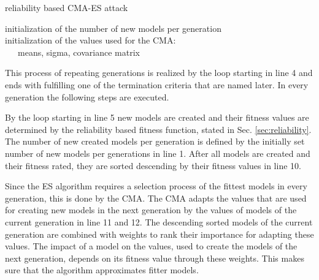 \SetAlCapHSkip{0.2em}
\begin{algorithm}[H] %
\Indm
\SetAlgoLined
\caption{reliability based \acl{CMA-ES} attack}
\label{alg:cma-es}
\Indp

initialization of the number of new models per generation\\
initialization of the values used for the \ac{CMA}:\\
\ \ \ means, sigma, covariance matrix\\
\end{algorithm}

This process of repeating generations is realized by the loop starting in line 4 and ends with fulfilling one of the termination criteria that are named later.
In every generation the following steps are executed.

By the loop starting in line 5 new models are created and their fitness values are determined by the reliability based fitness function, stated in Sec. \ref{sec:reliability}. %
The number of new created models per generation is defined by the initially set number of new models per generations in line 1.
After all models are created and their fitness rated, they are sorted descending by their fitness values in line 10.

Since the \ac{ES} algorithm requires a selection process of the fittest models in every generation, this is done by the \ac{CMA}.
The \ac{CMA} adapts the values that are used for creating new models in the next generation by the values of models of the current generation in line 11 and 12. %
The descending sorted models of the current generation are combined with weights to rank their importance for adapting these values.
The impact of a model on the values, used to create the models of the next generation, depends on its fitness value through these weights.
This makes sure that the algorithm approximates fitter models.

